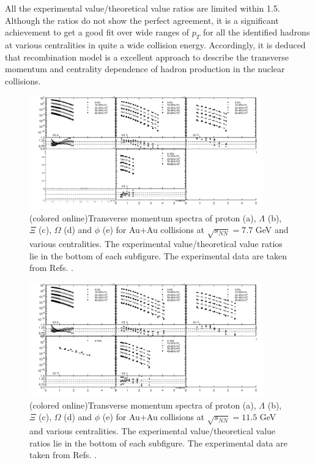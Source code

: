 \documentclass[twocolumn,aps,superscriptaddress,showpacs,nofootinbib,floatfix]{revtex4}
\begin{document}
 All the experimental value/theoretical value ratios are limited within 1.5. Although the ratios do not show the perfect agreement, it is a significant achievement to get a good fit over wide ranges of $p_T$ for all the identified hadrons at various centralities in quite a wide collision energy. Accordingly, it is deduced that recombination model is a excellent approach to describe the transverse momentum and centrality dependence of hadron production in the nuclear collisions. 
\begin{figure}[pht]
	\includegraphics[width=0.9\textwidth]{pic9.png}
	\caption{(colored online)Transverse momentum spectra of proton (a), $\Lambda$ (b), $\Xi$ (c), $\Omega$ (d) and $\phi$ (e) for Au+Au collisions at $\sqrt{s_{NN}}=7.7$ GeV and various centralities. The experimental value/theoretical value ratios lie in the bottom of each subfigure. The experimental data are taken from Refs. \cite{STAR:2019bjj,STAR:2017sal,STAR:2015vvs}.}
	\label{fig9}
\end{figure}
\begin{figure}[pht]
	\includegraphics[width=0.9\textwidth]{pic10.png}
	\caption{(colored online)Transverse momentum spectra of proton (a), $\Lambda$ (b), $\Xi$ (c), $\Omega$ (d) and $\phi$ (e) for Au+Au collisions at $\sqrt{s_{NN}}=11.5$ GeV and various centralities. The experimental value/theoretical value ratios lie in the bottom of each subfigure. The experimental data are taken from Refs. \cite{STAR:2019bjj,STAR:2017sal,STAR:2015vvs}.}
	\label{fig10}
\end{figure}
\end{document}
